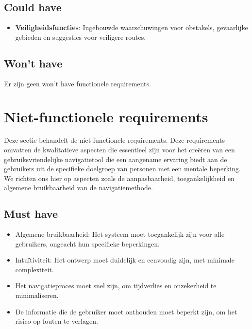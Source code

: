 \subsection*{Could have}
\begin{itemize}
    \item \textbf{Veiligheidsfuncties}: Ingebouwde waarschuwingen voor obstakels, gevaarlijke gebieden en suggesties voor veiligere routes.
\end{itemize}

\subsection*{Won't have}
Er zijn geen won't have functionele requirements.


\section{Niet-functionele requirements}
\label{sec:niet-functionele-requirements}

Deze sectie behandelt de niet-functionele requirements. Deze requirements omvatten de kwalitatieve aspecten die essentieel zijn voor het creëren van een gebruiksvriendelijke navigatietool die een aangename ervaring biedt aan de gebruikers uit de specifieke doelgroep van personen met een mentale beperking. We richten ons hier op aspecten zoals de aanpasbaarheid, toegankelijkheid en algemene bruikbaarheid van de navigatiemethode.


\subsection*{Must have}
\begin{itemize}
    \item {Algemene bruikbaarheid}: Het systeem moet toegankelijk zijn voor alle gebruikers, ongeacht hun specifieke beperkingen.
    \item {Intuïtiviteit}: Het ontwerp moet duidelijk en eenvoudig zijn, met minimale complexiteit.
    \item Het navigatieproces moet snel zijn, om tijdverlies en onzekerheid te minimaliseren.
    \item De informatie die de gebruiker moet onthouden moet beperkt zijn, om het risico op fouten te verlagen.
\end{itemize}

